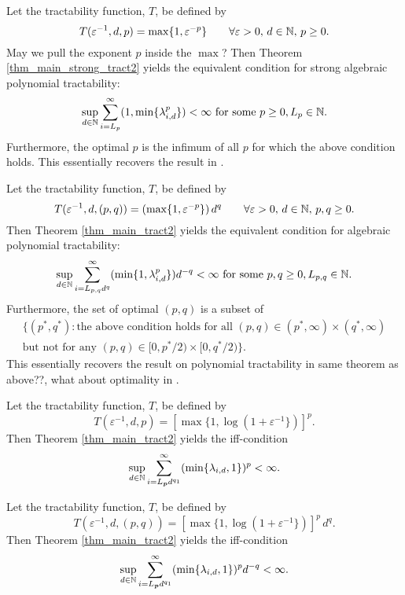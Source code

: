 \documentclass[11pt,a4paper]{article}
\newcommand{\fred}[1]{\begingroup\color{blue}#1\endgroup}
\begin{document}
\begin{example}

Let the tractability function, $T$,
be defined by
\[
 T(\varepsilon^{-1},d,p)= \max\{1,\varepsilon^{-p}\}
 \qquad \forall \varepsilon > 0, \,  d \in \mathbb{N}, \, p \ge 0.
\]
\fred{May we pull the exponent $p$ inside the $\max$?} Then Theorem \ref{thm_main_strong_tract2} yields the  equivalent condition for strong algebraic polynomial tractability:
\[
 \sup_{d\in\mathbb{N}} \sum_{i=L_p}^\infty (1,\min\{\lambda_{i,d}^p\}) < \infty \text{ for some } p \ge 0, L_p \in \mathbb{N}.
\]
Furthermore, the optimal $p$ is the infimum of all $p$ for which the above condition holds.
This essentially recovers the result in \cite[Theorem 5.1]{NW08}.
\end{example}

\begin{example}
Let the tractability function, $T$,
be defined by
\[
 T(\varepsilon^{-1},d,(p,q))= (\max\{1,\varepsilon^{-p}\})\, d^q
 \qquad \forall \varepsilon > 0, \,  d \in \mathbb{N}, \, p,q \ge 0.
\]
Then Theorem \ref{thm_main_tract2} yields the  equivalent condition for algebraic polynomial tractability:
\[
 \sup_{d\in\mathbb{N}} \sum_{i=L_{p,q} d^{q}}^\infty (\min\{1,\lambda_{i,d}^p\}) d^{-q} < \infty \text{ for some } p,q \ge 0, L_{p,q} \in \mathbb{N}.
\]
Furthermore, the set of optimal $(p,q)$ is a subset of
\begin{multline*}
\{(p^*,q^*) : \text{the above condition holds for all }(p,q) \in (p^*,\infty) \times (q^*,\infty) \\
\text{but not for any }(p,q) \in [0,p^*/2) \times [0,q^*/2)\}.
\end{multline*}
This essentially recovers the result on polynomial tractability in \cite[Theorem 5.1]{NW08} \fred{same theorem as above??, what about optimality in \cite[Theorem 5.1]{NW08}}.
\end{example}


\begin{example}
Let the tractability function, $T$,
be defined by
\[
 T(\varepsilon^{-1},d,p)= \left[\max\{1,\log(1+\varepsilon^{-1}\})\right]^p.
\]
Then Theorem \ref{thm_main_tract2} yields the iff-condition
\[
 \sup_{d\in\mathbb{N}} \sum_{i=L_{\boldsymbol{p}} d^{q_1}}^\infty (\min\{\lambda_{i,d},1\})^p  < \infty.
\]
\end{example}
\begin{example}

Let the tractability function, $T$,
be defined by
\[
 T(\varepsilon^{-1},d,(p,q))=\left[\max\{1,\log(1+\varepsilon^{-1}\})\right]^p\, d^q.
\]
Then Theorem \ref{thm_main_tract2} yields the iff-condition
\[
 \sup_{d\in\mathbb{N}} \sum_{i=L_{\boldsymbol{p}} d^{q_1}}^\infty (\min\{\lambda_{i,d},1\})^p d^{-q} < \infty.
\]
\end{example}
\bigskip
\end{document}
